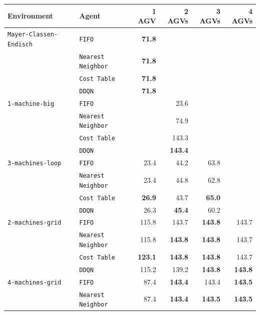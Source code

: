\documentclass[sn-mathphys]{sn-jnl}
\begin{document}
\begin{table}[ht]
\centering
\bgroup
\def\arraystretch{1.1} %
    
\begin{tabular}{|l|l||r|r|r|r|}
\hline
Environment & Agent & 1 AGV & 2 AGVs & 3 AGVs & 4 AGVs \\
\hline \texttt{Mayer-Classen-Endisch} & \texttt{FIFO}& \textbf{71.8} \quad & & &  \\ 
 & \texttt{Nearest Neighbor} & \textbf{71.8} \quad & & &  \\ 
 & \texttt{Cost Table} & \textbf{71.8} \quad & & &  \\ 
 & \texttt{DDQN} & \textbf{71.8} \quad & & &  \\ 
\hline \texttt{1-machine-big} & \texttt{FIFO}& & 23.6  \quad & &  \\ 
 & \texttt{Nearest Neighbor} & & 74.9  \quad & &  \\ 
 & \texttt{Cost Table} & & 143.3  \quad & &  \\ 
 & \texttt{DDQN} & & \textbf{143.4} \quad & &  \\ 
\hline \texttt{3-machines-loop} & \texttt{FIFO}& 23.4  \quad & 44.2  \quad & 63.8  \quad &  \\ 
 & \texttt{Nearest Neighbor} & 23.4  \quad & 44.8  \quad & 62.8  \quad &  \\ 
 & \texttt{Cost Table} & \textbf{26.9} \quad & 43.7  \quad & \textbf{65.0} \quad &  \\ 
 & \texttt{DDQN} & 26.3  \quad & \textbf{45.4} \quad & 60.2  \quad &  \\ 
\hline \texttt{2-machines-grid} & \texttt{FIFO}& 115.8  \quad & 143.7  \quad & \textbf{143.8} \quad & 143.7  \quad  \\ 
 & \texttt{Nearest Neighbor} & 115.8  \quad & \textbf{143.8} \quad & \textbf{143.8} \quad & 143.7  \quad  \\ 
 & \texttt{Cost Table} & \textbf{123.1} \quad & \textbf{143.8} \quad & \textbf{143.8} \quad & 143.7  \quad  \\ 
 & \texttt{DDQN} & 115.2  \quad & 139.2  \quad & \textbf{143.8} \quad & \textbf{143.8} \quad  \\ 
\hline \texttt{4-machines-grid} & \texttt{FIFO}& 87.4  \quad & \textbf{143.4} \quad & 143.4  \quad & \textbf{143.5} \quad  \\ 
 & \texttt{Nearest Neighbor} & 87.4  \quad & \textbf{143.4} \quad & \textbf{143.5} \quad & \textbf{143.5} \quad  \\ 

\end{tabular}
\end{table}
\end{document}
